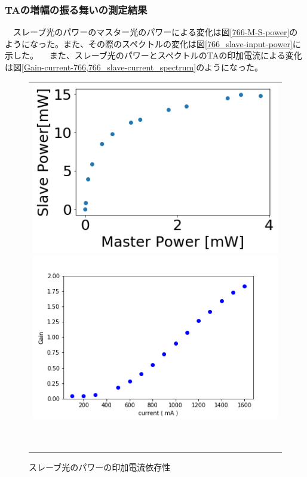 \documentclass[uplatex, dvipdfmx, a4paper, report, papersize, 11pt]{jsbook}
\begin{document}
\subsubsection{TAの増幅の振る舞いの測定結果}
　スレーブ光のパワーのマスター光のパワーによる変化は図\ref{766-M-S-power}のようになった。また、その際のスペクトルの変化は図\ref{766_slave-input-power}に示した。
　また、スレーブ光のパワーとスペクトルのTAの印加電流による変化は図\ref{Gain-current-766,766_slave-current_spectrum}のようになった。
\begin{figure}[htpb]
  \centering
    \begin{tabular}{c}

      \begin{minipage}{0.50\hsize}
        \centering
          \includegraphics[keepaspectratio,  scale=0.45,  angle=0]
                          {figures/chapter4/766-M-S-power.png}
                          \caption{スレーブ光のパワーのマスター光のパワー依存性}
                          \label{766-M-S-power}
      \end{minipage}
      \begin{minipage}{0.50\hsize}
        \centering
          \includegraphics[keepaspectratio,  scale=0.5,  angle=0]
                          {figures/chapter4/Gain-current-766.png}
                          \caption{スレーブ光のパワーの印加電流依存性}
                          \label{Gain-current-766}
      \end{minipage}
　  \end{tabular}
\end{figure}
\end{document}
